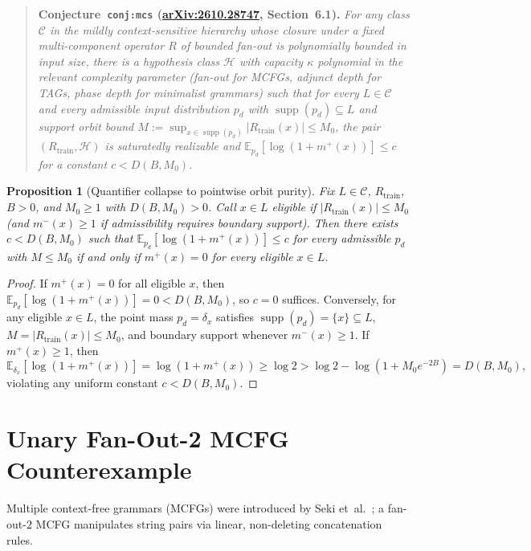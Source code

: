\documentclass[11pt]{article}
\theoremstyle{plain}
\newtheorem{proposition}[theorem]{Proposition}
\theoremstyle{definition}
\theoremstyle{remark}
\DeclareMathOperator{\supp}{supp}
\begin{document}
\begin{quote}
\textbf{Conjecture~\texttt{conj:mcs} (\href{https://arxiv.org/abs/2610.28747}{arXiv:2610.28747}, Section~6.1).}
\emph{For any class $\mathcal{C}$ in the mildly context-sensitive hierarchy whose closure under a fixed multi-component operator $R$ of bounded fan-out is polynomially bounded in input size, there is a hypothesis class $\mathcal{H}$ with capacity $\kappa$ polynomial in the relevant complexity parameter (fan-out for MCFGs, adjunct depth for TAGs, phase depth for minimalist grammars) such that for every $L \in \mathcal{C}$ and every admissible input distribution $p_d$ with $\supp(p_d) \subseteq L$ and support orbit bound $M := \sup_{x \in \supp(p_d)} |R_{\mathrm{train}}(x)| \le M_0$, the pair $(R_{\mathrm{train}}, \mathcal{H})$ is saturatedly realizable and $\mathbb{E}_{p_d}[\log(1 + m^+(x))] \le c$ for a constant $c < D(B, M_0)$.}
\end{quote}

\begin{proposition}[Quantifier collapse to pointwise orbit purity]\label{prop:purity}
Fix $L \in \mathcal{C}$, $R_{\mathrm{train}}$, $B > 0$, and $M_0 \ge 1$ with $D(B, M_0) > 0$. Call $x \in L$ \emph{eligible} if $|R_{\mathrm{train}}(x)| \le M_0$ (and $m^-(x) \ge 1$ if admissibility requires boundary support). Then there exists $c < D(B, M_0)$ such that $\mathbb{E}_{p_d}[\log(1 + m^+(x))] \le c$ for every admissible $p_d$ with $M \le M_0$ if and only if $m^+(x) = 0$ for every eligible $x \in L$.
\end{proposition}

\begin{proof}
If $m^+(x) = 0$ for all eligible $x$, then $\mathbb{E}_{p_d}[\log(1+m^+(x))] = 0 < D(B, M_0)$, so $c = 0$ suffices.
Conversely, for any eligible $x \in L$, the point mass $p_d = \delta_x$ satisfies $\supp(p_d) = \{x\} \subseteq L$, $M = |R_{\mathrm{train}}(x)| \le M_0$, and boundary support whenever $m^-(x) \ge 1$. If $m^+(x) \ge 1$, then
\[
\mathbb{E}_{\delta_x}[\log(1 + m^+(x))] = \log(1 + m^+(x)) \ge \log 2 > \log 2 - \log(1 + M_0 e^{-2B}) = D(B, M_0),
\]
violating any uniform constant $c < D(B, M_0)$.
\end{proof}

\section{Unary Fan-Out-2 MCFG Counterexample}

Multiple context-free grammars (MCFGs) were introduced by Seki et~al.~\cite{seki1991mcfg}; a fan-out-$2$ MCFG manipulates string pairs via linear, non-deleting concatenation rules.
\end{document}
